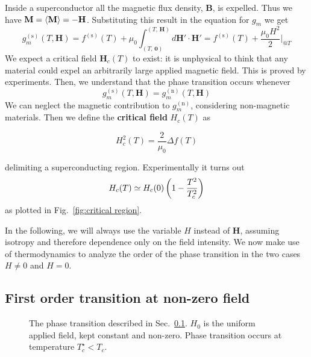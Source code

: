 Inside a superconductor all the magnetic flux density, $\mathbf{B}$, is expelled. Thus we have $\mathbf{M} = \ev{\mathbf{M}} = - \mathbf{H}$. Substituting this result in the equation for $g_m$ we get
\begin{equation}\label{eq:critical field preliminary}
    g_m^{(\mathrm{s})}(T,\mathbf{H}) = f^{(\mathrm{s})}(T) + \mu_0 \int_{(T,\,\mathbf{0})}^{(T,\,\mathbf{H})} d \mathbf{H}' \cdot \mathbf{H}' = f^{(\mathrm{s})}(T) + \frac{\mu_0 H^2}{2} \bigg|_{@T}
\end{equation}
We expect a critical field $\mathbf{H}_c(T)$ to exist: it is unphysical to think that any material could expel an arbitrarily large applied magnetic field. This is proved by experiments. Then, we understand that the phase transition occurs whenever
\[
    g_m^{(\mathrm{s})}(T,\mathbf{H}) = g_m^{(\mathrm{n})}(T,\mathbf{H})
\]
We can neglect the magnetic contribution to $g_m^{(\mathrm{n})}$, considering non-magnetic materials. Then we define the \textbf{critical field} $H_c(T)$ as
\begin{eqbox}
    \begin{equation}\label{eq:critical field}
        H_c^2(T) = \frac{2}{\mu_0} \Delta f(T)
    \end{equation}
\end{eqbox}
delimiting a superconducting region. Experimentally it turns out
\[
    H_c(T) \simeq H_c (0) \left({1 - \frac{T^2}{T_c^2}}\right)
\]
as plotted in Fig.~\ref{fig:critical region}.

In the following, we will always use the variable $H$ instead of $\mathbf{H}$, assuming isotropy and therefore dependence only on the field intensity. We now make use of thermodynamics to analyze the order of the phase transition in the two cases $H\neq0$ and $H=0$.

\subsection{First order transition at non-zero field}\label{sec:first order transition}

\begin{figure}
    \centering
    
    \caption{The phase transition described in Sec.~\ref{sec:first order transition}. $H_0$ is the uniform applied field, kept constant and non-zero. Phase transition occurs at temperature $T_c^\star < T_c$.}
    \label{fig:critical region first order}
\end{figure}

